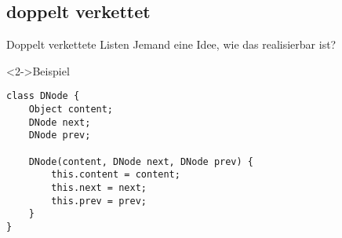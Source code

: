 \documentclass[18pt]{beamer}
\begin{document}
\subsection{doppelt verkettet}
\begin{frame}[fragile]{Doppelt verkettete Listen}
Jemand eine Idee, wie das realisierbar ist? \pause
\begin{exampleblock}<2->{Beispiel}
\begin{lstlisting}[basicstyle=\scriptsize]
class DNode {
	Object content;
	DNode next; 
	DNode prev;
	
	DNode(content, DNode next, DNode prev) {
		this.content = content;
		this.next = next; 
		this.prev = prev;
	}
}
\end{lstlisting}
\end{exampleblock} \pause

\end{frame}



\appendix
\beginbackup


\backupend
\end{document}
